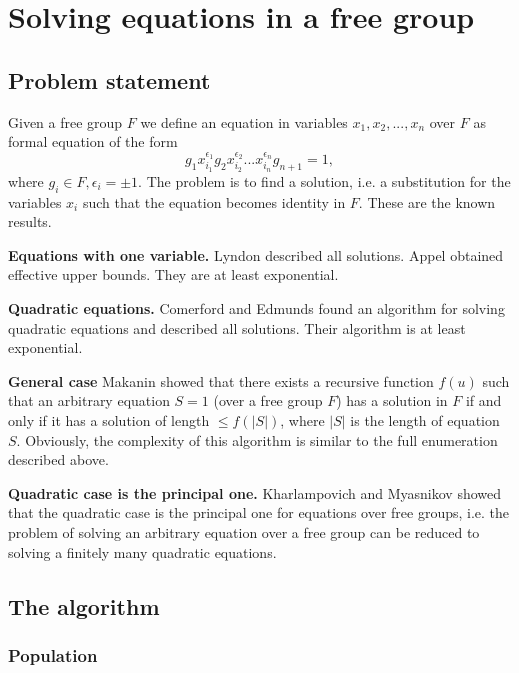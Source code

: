 \documentclass{article}
\begin{document}
\section{Solving equations in a free group}

  \subsection{Problem statement}

Given a free group $F$ we define an equation in variables
$x_1,x_2,...,x_n$ over $F$ as formal equation of the form
\begin{equation}
g_1 x_{i_1}^{\epsilon_1} g_2 x_{i_2}^{\epsilon_2} ... x_{i_n}^{\epsilon_n} g_{n+1} = 1, \label{eq1}
\end{equation}
where $g_i \in F, \epsilon_i = \pm 1$. The problem is to find a
solution, i.e. a substitution for the variables $x_i$ such that the
equation becomes identity in $F$. These are the known results.

{\bf Equations with one variable.} Lyndon \cite{Lyndon} described all
solutions. Appel \cite{Appel} obtained effective upper bounds. They
are at least exponential.

{\bf Quadratic equations.} Comerford and Edmunds \cite{C&E:Equations2,
C&E:Equations1} found an algorithm for solving quadratic equations and
described all solutions. Their algorithm is at least exponential.

{\bf General case} Makanin \cite{Makanin} showed that there exists a
recursive function $f(u)$ such that an arbitrary equation $S = 1$
(over a free group $F$) has a solution in $F$ if and only if it has a
solution of length $ \le f(|S|)$, where $|S|$ is the length of
equation $S$. Obviously, the complexity of this algorithm is similar
to the full enumeration described above. 

{\bf Quadratic case is the principal one.} Kharlampovich and Myasnikov
\cite {K&M} showed that the quadratic case is the principal one for
equations over free groups, i.e. the problem of solving an arbitrary
equation over a free group can be reduced to solving a finitely many
quadratic equations.

  \subsection{The algorithm}

    \subsubsection{Population}
\end{document}
